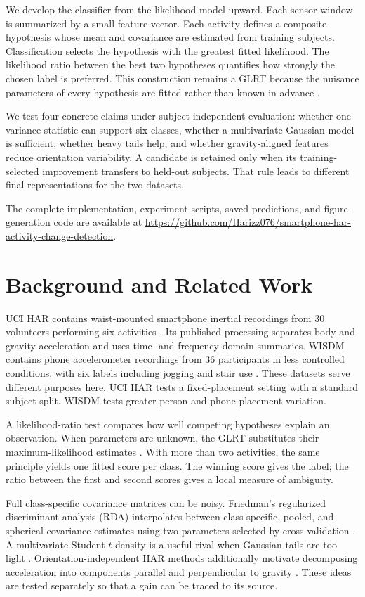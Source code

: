 \documentclass[a4paper,conference,10pt]{IEEEtran}
\begin{document}
We develop the classifier from the likelihood model upward. Each sensor window is summarized by a small feature vector. Each activity defines a composite hypothesis whose mean and covariance are estimated from training subjects. Classification selects the hypothesis with the greatest fitted likelihood. The likelihood ratio between the best two hypotheses quantifies how strongly the chosen label is preferred. This construction remains a GLRT because the nuisance parameters of every hypothesis are fitted rather than known in advance \cite{kay}.

We test four concrete claims under subject-independent evaluation: whether one variance statistic can support six classes, whether a multivariate Gaussian model is sufficient, whether heavy tails help, and whether gravity-aligned features reduce orientation variability. A candidate is retained only when its training-selected improvement transfers to held-out subjects. That rule leads to different final representations for the two datasets.

The complete implementation, experiment scripts, saved predictions, and figure-generation code are available at \url{https://github.com/Harizz076/smartphone-har-activity-change-detection}.

\section{Background and Related Work}
UCI HAR contains waist-mounted smartphone inertial recordings from 30 volunteers performing six activities \cite{anguita,uci}. Its published processing separates body and gravity acceleration and uses time- and frequency-domain summaries. WISDM contains phone accelerometer recordings from 36 participants in less controlled conditions, with six labels including jogging and stair use \cite{kwapisz}. These datasets serve different purposes here. UCI HAR tests a fixed-placement setting with a standard subject split. WISDM tests greater person and phone-placement variation.

A likelihood-ratio test compares how well competing hypotheses explain an observation. When parameters are unknown, the GLRT substitutes their maximum-likelihood estimates \cite{kay}. With more than two activities, the same principle yields one fitted score per class. The winning score gives the label; the ratio between the first and second scores gives a local measure of ambiguity.

Full class-specific covariance matrices can be noisy. Friedman's regularized discriminant analysis (RDA) interpolates between class-specific, pooled, and spherical covariance estimates using two parameters selected by cross-validation \cite{friedman}. A multivariate Student-$t$ density is a useful rival when Gaussian tails are too light \cite{liurubin}. Orientation-independent HAR methods additionally motivate decomposing acceleration into components parallel and perpendicular to gravity \cite{guo}. These ideas are tested separately so that a gain can be traced to its source.
\end{document}
